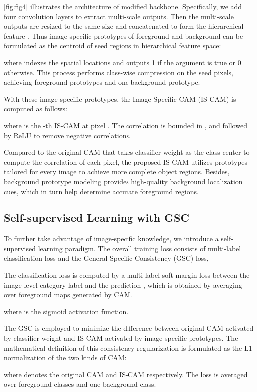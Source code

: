 \documentclass[10pt,twocolumn,letterpaper]{article}
\begin{document}
\cref{fig:fig4} illustrates the architecture of modified backbone.
Specifically, we add four convolution layers to extract multi-scale outputs.
Then the multi-scale outputs are resized to the same size and concatenated to form the hierarchical feature .
Thus image-specific prototypes  of foreground and background can be formulated as the centroid of seed regions in hierarchical feature space:

where  indexes the spatial locations and  outputs 1 if the argument is true or 0 otherwise.
This process performs class-wise compression on the seed pixels, achieving  foreground prototypes and one background prototype.

With these image-specific prototypes, the Image-Specific CAM (IS-CAM) is computed as follows:

where  is the -th IS-CAM at pixel .
The correlation is bounded in , and followed by ReLU to remove negative correlations.

Compared to the original CAM that takes classifier weight as the class center to compute the correlation of each pixel, the proposed IS-CAM utilizes prototypes tailored for every image to achieve more complete object regions.
Besides, background prototype modeling provides high-quality background localization cues, which in turn help determine accurate foreground regions.

\subsection{Self-supervised Learning with GSC}
To further take advantage of image-specific knowledge, we introduce a self-supervised learning paradigm.
The overall training loss consists of multi-label classification loss and the General-Specific Consistency (GSC) loss,


The classification loss is computed by a multi-label soft margin loss between the image-level category label  and the prediction , which is obtained by averaging over foreground maps generated by CAM.

where  is the sigmoid activation function.

The GSC is employed to minimize the difference between original CAM activated by classifier weight and IS-CAM activated by image-specific prototypes.
The mathematical definition of this consistency regularization is formulated as the L1 normalization of the two kinds of CAM:

where  denotes the original CAM and IS-CAM respectively.
The loss is averaged over  foreground classes and one background class.
\end{document}
